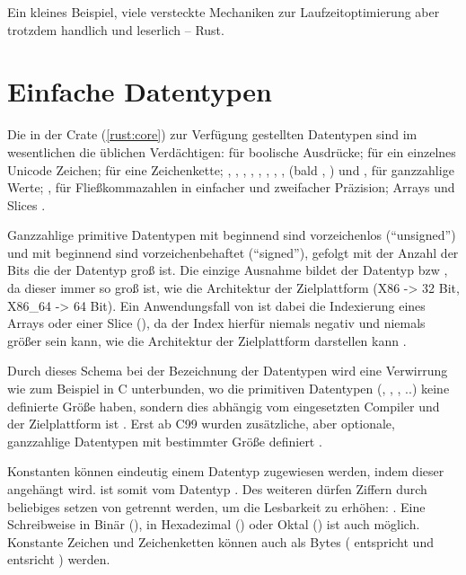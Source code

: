 Ein kleines Beispiel, viele versteckte Mechaniken zur Laufzeitoptimierung aber trotzdem handlich und leserlich -- Rust.

\section{Einfache Datentypen}
\label{rust:types:simple}

Die in der  Crate (\autoref{rust:core}) zur Verfügung gestellten Datentypen sind im wesentlichen die üblichen  Verdächtigen:  für boolische Ausdrücke;  für ein einzelnes Unicode Zeichen;  für eine Zeichenkette; , , , , , , , , (bald ,  \cite{rust:github:128bit_integer:rfc}) und ,   für ganzzahlige Werte; ,  für Fließkommazahlen in einfacher und zweifacher Präzision; Arrays und Slices \cite{rust:book:primitives}.

Ganzzahlige primitive Datentypen mit  beginnend sind vorzeichenlos (\enquote{unsigned}) und mit  beginnend sind vorzeichenbehaftet (\enquote{signed}), gefolgt mit der Anzahl der Bits  die der Datentyp groß ist.
 Die einzige Ausnahme bildet der Datentyp  bzw , da dieser immer so groß ist, wie die Architektur der Zielplattform (X86 -> 32 Bit, X86\_64 -> 64 Bit).
Ein Anwendungsfall von  ist dabei die Indexierung eines Arrays oder einer Slice (), da der Index hierfür niemals negativ und niemals größer sein kann, wie die Architektur der Zielplattform darstellen kann .

Durch dieses Schema bei der Bezeichnung der Datentypen wird eine Verwirrung wie zum Beispiel in C unterbunden, wo die primitiven Datentypen (, , , ..) keine definierte Größe haben, sondern dies abhängig vom eingesetzten Compiler und der Zielplattform ist \cite[187]{deitel2013c}. Erst ab C99 wurden zusätzliche, aber optionale, ganzzahlige Datentypen mit bestimmter Größe definiert \cite[141]{goll2014c}.

Konstanten können eindeutig einem Datentyp zugewiesen werden, indem dieser angehängt wird.
 ist somit vom Datentyp .
Des weiteren dürfen Ziffern durch beliebiges setzen von \rustcinline{_} getrennt werden, um die Lesbarkeit zu erhöhen: .
Eine Schreibweise in Binär (), in Hexadezimal () oder Oktal () ist auch möglich. 
Konstante Zeichen und Zeichenketten können auch als Bytes ( entspricht  und  entsricht \rustcinline{&[u8]})  werden.


